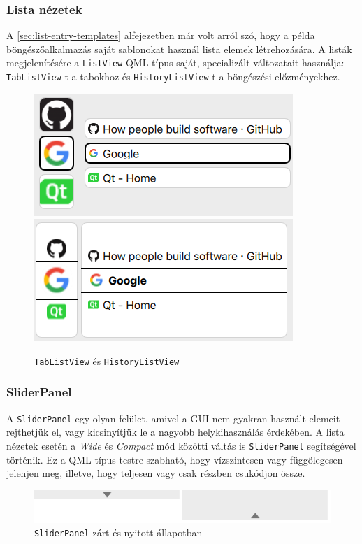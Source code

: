 \documentclass[12pt]{report}
\begin{document}
\subsubsection{Lista nézetek}
A \ref{sec:list-entry-templates} alfejezetben már volt arról szó, hogy a példa
böngészőalkalmazás saját sablonokat használ lista elemek létrehozására. A listák
megjelenítésére a \texttt{ListView} QML típus saját, specializált változatait használja:
\texttt{TabListView}-t a tabokhoz és \texttt{HistoryListView}-t a böngészési előzményekhez.
\begin{figure}[H]
    \centering
    \includegraphics[scale=0.5]{TabListView}
    \includegraphics[scale=0.5]{HistoryListView}
    \caption{
        \label{fig:tab-list-view}
        \texttt{TabListView} és \texttt{HistoryListView}
    }
\end{figure}

\subsubsection{SliderPanel}
A \texttt{SliderPanel} egy olyan felület, amivel a GUI nem gyakran használt elemeit rejthetjük
el, vagy kicsinyítjük le a nagyobb helykihasználás érdekében. A lista nézetek esetén a
\textit{Wide} és \textit{Compact} mód közötti váltás is \texttt{SliderPanel} segítségével
történik. Ez a QML típus testre szabható, hogy vízszintesen vagy függőlegesen jelenjen meg,
illetve, hogy teljesen vagy csak részben csukódjon össze.
\begin{figure}[H]
    \centering
    \includegraphics[scale=0.8]{SliderPanel}
    \caption{
        \label{fig:slider-panel}
        \texttt{SliderPanel} zárt és nyitott állapotban
    }
\end{figure}
\end{document}
